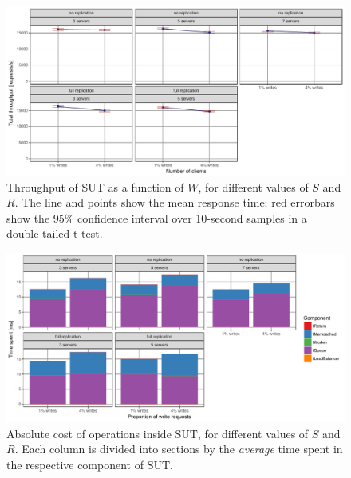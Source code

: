 \documentclass[11pt]{article}
\begin{document}
\begin{figure}[h]
\centering
\includegraphics[width=\textwidth]{../results/writes/graphs/throughput_vs_writes.pdf}
\caption{Throughput of SUT as a function of $W$, for different values of $S$ and $R$. The line and points show the mean response time; red errorbars show the 95\% confidence interval over 10-second samples in a double-tailed t-test.}
\label{fig:exp3:res:throughput}
\end{figure}

\begin{figure}[h]
\centering
\includegraphics[width=\textwidth]{../results/writes/graphs/time_breakdown_vs_writes_set_abs.pdf}
\caption{Absolute cost of operations inside SUT, for different values of $S$ and $R$. Each column is divided into sections by the \emph{average} time spent in the respective component of SUT.}
\label{fig:exp3:res:breakdown:set:abs}
\end{figure}
\end{document}
